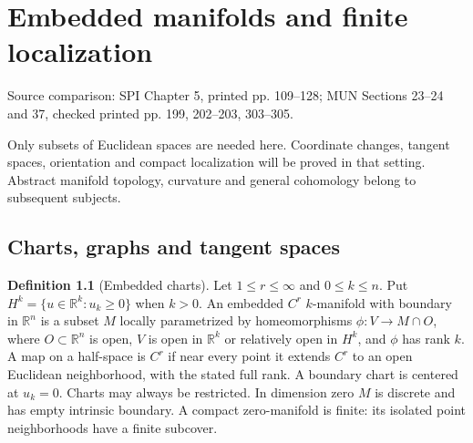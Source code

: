 \documentclass[11pt,oneside,openany]{book}
\theoremstyle{definition}
\newtheorem{definition}[theorem]{Definition}
\theoremstyle{remark}
\newcommand{\R}{\mathbb R}
\newcommand{\family}[1]{}
\newcommand{\source}[1]{\par\begingroup\small\sffamily\color{black!65}Source comparison: #1\par\endgroup}
\begin{document}
\chapter{Embedded manifolds and finite localization}
\label{ch:d04-14}
\source{SPI Chapter 5, printed pp. 109--128; MUN Sections 23--24 and 37, checked printed pp. 199, 202--203, 303--305.}

Only subsets of Euclidean spaces are needed here. Coordinate changes,
tangent spaces, orientation and compact localization will be proved in that
setting. Abstract manifold topology, curvature and general cohomology belong
to subsequent subjects.

\section{Charts, graphs and tangent spaces}
\family{K04.14.01}\family{K04.14.02}\family{K04.14.04}
\begin{definition}[Embedded charts]\label{d04:14:embedded}
Let $1\le r\le\infty$ and $0\le k\le n$. Put
$H^k=\{u\in\R^k:u_k\ge0\}$ when $k>0$. An embedded $C^r$
$k$-manifold with boundary in $\R^n$ is a subset $M$ locally parametrized
by homeomorphisms $\phi:V\to M\cap O$, where $O\subset\R^n$ is open,
$V$ is open in $\R^k$ or relatively open in $H^k$, and $\phi$ has rank
$k$. A map on a half-space is $C^r$ if near every point it extends $C^r$
to an open Euclidean neighborhood, with the stated full rank. A boundary
chart is centered at $u_k=0$. Charts may always be restricted. In dimension
zero $M$ is discrete and has empty intrinsic boundary. A compact zero-manifold
is finite: its isolated point neighborhoods have a finite subcover.
\end{definition}
\end{document}
